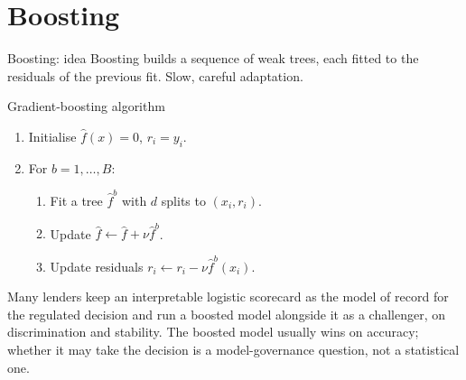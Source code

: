 \documentclass[aspectratio=169,11pt]{beamer}
\begin{document}
\section{Boosting}

\begin{frame}{Boosting: idea}
  Boosting builds a sequence of weak trees, each fitted to the
  residuals of the previous fit. Slow, careful adaptation.
  \begin{block}{Gradient-boosting algorithm}
    \begin{enumerate}
      \item Initialise $\hat f(x) = 0$, $r_i = y_i$.
      \item For $b = 1, \ldots, B$:
        \begin{enumerate}
          \item Fit a tree $\hat f^b$ with $d$ splits to $(x_i, r_i)$.
          \item Update $\hat f \leftarrow \hat f + \nu \hat f^b$.
          \item Update residuals
                $r_i \leftarrow r_i - \nu \hat f^b(x_i)$.
        \end{enumerate}
    \end{enumerate}
  \end{block}
  \begin{industry}
    Many lenders keep an interpretable logistic scorecard as the model of record for the regulated decision and run a boosted model alongside it as a challenger, on discrimination and stability. The boosted model usually wins on accuracy; whether it may take the decision is a model-governance question, not a statistical one.
  \end{industry}
\end{frame}
\end{document}
